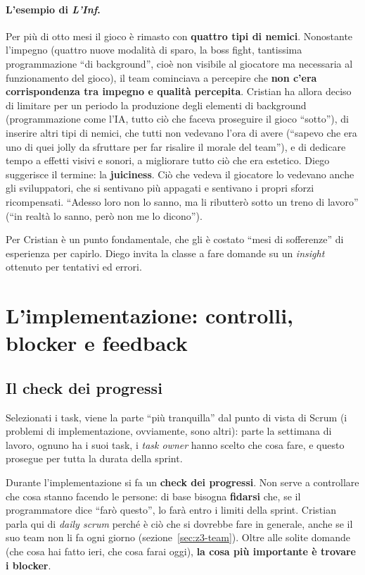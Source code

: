 \paragraph{L'esempio di \emph{L'Inf}.} Per più di otto mesi il gioco è rimasto
con \textbf{quattro tipi di nemici}. Nonostante l'impegno (quattro nuove
modalità di sparo, la boss fight, tantissima programmazione ``di
background'', cioè non visibile al giocatore ma necessaria al funzionamento
del gioco), il team cominciava a percepire che \textbf{non c'era corrispondenza
tra impegno e qualità percepita}. Cristian ha allora deciso di limitare per un
periodo la produzione degli elementi di background (programmazione come l'IA,
tutto ciò che faceva proseguire il gioco ``sotto''), di inserire altri tipi di
nemici, che tutti non vedevano l'ora di avere (``sapevo che era uno di quei
jolly da sfruttare per far risalire il morale del team''), e di dedicare tempo
a effetti visivi e sonori, a migliorare tutto ciò che era estetico. Diego
suggerisce il termine: la \textbf{juiciness}. Ciò che vedeva il giocatore lo
vedevano anche gli sviluppatori, che si sentivano più appagati e sentivano i
propri sforzi ricompensati. ``Adesso loro non lo sanno, ma li ributterò sotto
un treno di lavoro'' (``in realtà lo sanno, però non me lo dicono'').

Per Cristian è un punto fondamentale, che gli è costato ``mesi di
sofferenze'' di esperienza per capirlo. Diego invita la classe a fare domande
su un \emph{insight} ottenuto per tentativi ed errori.

\section{L'implementazione: controlli, blocker e feedback}
\label{sec:z3-implementazione}

\subsection{Il check dei progressi}

Selezionati i task, viene la parte ``più tranquilla'' dal punto di vista di
Scrum (i problemi di implementazione, ovviamente, sono altri): parte la
settimana di lavoro, ognuno ha i suoi task, i \emph{task owner} hanno scelto
che cosa fare, e questo prosegue per tutta la durata della sprint.

Durante l'implementazione si fa un \textbf{check dei progressi}. Non serve a
controllare che cosa stanno facendo le persone: di base bisogna
\textbf{fidarsi} che, se il programmatore dice ``farò questo'', lo farà entro i
limiti della sprint. Cristian parla qui di \emph{daily scrum} perché è ciò che
si dovrebbe fare in generale, anche se il suo team non li fa ogni giorno
(sezione~\ref{sec:z3-team}). Oltre alle solite domande (che cosa hai fatto
ieri, che cosa farai oggi), \textbf{la cosa più importante è trovare i
blocker}.


